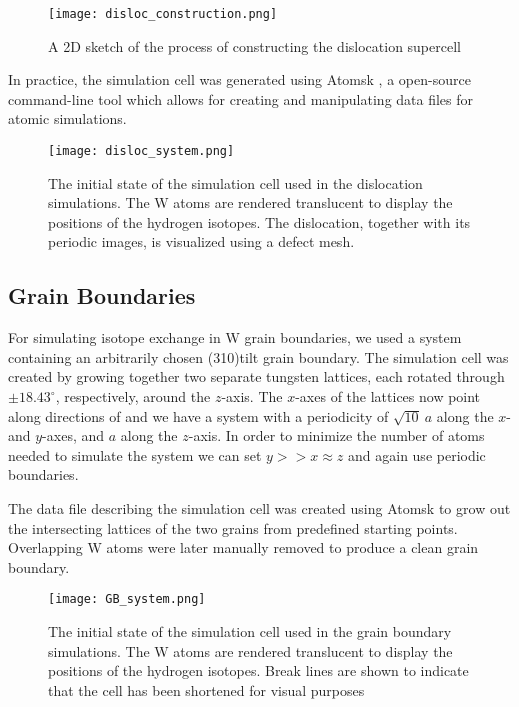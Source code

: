 \begin{figure}[!ht]
\center
\texttt{[image: disloc\_construction.png]}
\caption{A 2D sketch of the process of constructing the dislocation supercell}
\label{Fig:disloc_construction}
\end{figure}

In practice, the simulation cell was generated using Atomsk \cite{hirel2015atomsk}, a open-source command-line tool which allows for creating and manipulating data files for atomic simulations. 

\begin{figure}[!ht]
\center
\texttt{[image: disloc\_system.png]}
\caption{The initial state of the simulation cell used in the dislocation simulations. 
The W atoms are rendered translucent to display the positions of the hydrogen isotopes. 
The dislocation, together with its periodic images, is visualized using a defect mesh.}
\label{Fig:disloc_system}
\end{figure}

\subsection{Grain Boundaries}
For simulating isotope exchange in W grain boundaries, we used a system containing an arbitrarily chosen \hkl(310)\hkl[001] tilt grain boundary. The simulation cell was created by growing together two separate tungsten lattices, each rotated through $\pm18.43^\circ$, respectively, around the $z$-axis. 
The $x$-axes of the lattices now point along directions of  and we have a system with a periodicity of $\sqrt{10}~a$ along the $x$- and $y$-axes, and $a$ along the $z$-axis. 
In order to minimize the number of atoms needed to simulate the system we can set $y >> x \approx z$ and again use periodic boundaries.


The data file describing the simulation cell was created using Atomsk \cite{hirel2015atomsk} to grow out the intersecting lattices of the two grains from predefined starting points. 
Overlapping W atoms were later manually removed to produce a clean grain boundary.

\begin{figure}[!ht]
\center
\texttt{[image: GB\_system.png]}
\caption{The initial state of the simulation cell used in the grain boundary simulations. 
The W atoms are rendered translucent to display the positions of the hydrogen isotopes. Break lines are shown to indicate that the cell has been shortened for visual purposes}
\label{Fig:GB_system}
\end{figure}


